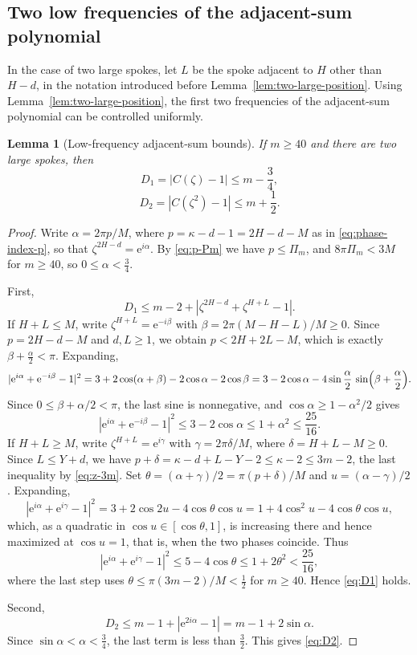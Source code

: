 \documentclass[11pt]{article}
\newtheorem{lemma}[theorem]{Lemma}
\theoremstyle{definition}
\theoremstyle{remark}
\numberwithin{equation}{section}
\newcommand{\e}{\mathrm{e}}
\begin{document}
\subsection{Two low frequencies of the adjacent-sum polynomial}

In the case of two large spokes, let $L$ be the spoke adjacent to $H$ other than $H-d$, in the notation introduced before Lemma~\ref{lem:two-large-position}. Using Lemma~\ref{lem:two-large-position}, the first two frequencies of the adjacent-sum polynomial can be controlled uniformly.

\begin{lemma}[Low-frequency adjacent-sum bounds]\label{lem:D12}
If $m\ge40$ and there are two large spokes, then
\begin{equation}\label{eq:D1}
  D_1=|C(\zeta)-1|\le m-\frac34,
\end{equation}
\begin{equation}\label{eq:D2}
  D_2=|C(\zeta^2)-1|\le m+\frac12.
\end{equation}
\end{lemma}

\begin{proof}
Write $\alpha=2\pi p/M$, where $p=\kappa-d-1=2H-d-M$ as in
\eqref{eq:phase-index-p}, so that $\zeta^{2H-d}=\e^{i\alpha}$. By
\eqref{eq:p-Pm} we have $p\le\Pi_m$, and $8\pi\Pi_m<3M$ for $m\ge40$, so
$0\le\alpha<\tfrac34$.

First,
\[
  D_1\le m-2+
  |\zeta^{2H-d}+\zeta^{H+L}-1|.
\]
If $H+L\le M$, write $\zeta^{H+L}=\e^{-i\beta}$ with
$\beta=2\pi(M-H-L)/M\ge0$. Since $p=2H-d-M$ and $d,L\ge1$, we obtain
$p<2H+2L-M$, which is exactly $\beta+\tfrac\alpha2<\pi$. Expanding,
\[
  |\e^{i\alpha}+\e^{-i\beta}-1|^2
  =3+2\cos(\alpha+\beta)-2\cos\alpha-2\cos\beta
  =3-2\cos\alpha-4\sin\frac\alpha2\,\sin\Bigl(\beta+\frac\alpha2\Bigr).
\]
Since $0\le\beta+\alpha/2<\pi$, the last sine is nonnegative, and
$\cos\alpha\ge1-\alpha^2/2$ gives
\[
  |\e^{i\alpha}+\e^{-i\beta}-1|^2
  \le3-2\cos\alpha\le1+\alpha^2\le\frac{25}{16}.
\]
If $H+L\ge M$, write $\zeta^{H+L}=\e^{i\gamma}$ with $\gamma=2\pi\delta/M$,
where $\delta=H+L-M\ge0$. Since $L\le Y+d$, we have
$p+\delta=\kappa-d+L-Y-2\le\kappa-2\le3m-2$, the last inequality by
\eqref{eq:z-3m}. Set $\theta=(\alpha+\gamma)/2=\pi(p+\delta)/M$ and
$u=(\alpha-\gamma)/2$. Expanding,
\[
  |\e^{i\alpha}+\e^{i\gamma}-1|^2
  =3+2\cos2u-4\cos\theta\cos u
  =1+4\cos^2u-4\cos\theta\cos u,
\]
which, as a quadratic in $\cos u\in[\cos\theta,1]$, is increasing there and
hence maximized at $\cos u=1$, that is, when the two phases coincide. Thus
\[
  |\e^{i\alpha}+\e^{i\gamma}-1|^2
  \le5-4\cos\theta
  \le1+2\theta^2
  <\frac{25}{16},
\]
where the last step uses $\theta\le\pi(3m-2)/M<\tfrac12$ for $m\ge40$. Hence
\eqref{eq:D1} holds.

Second,
\[
  D_2\le m-1+|\e^{2i\alpha}-1|
  =m-1+2\sin\alpha.
\]
Since $\sin\alpha<\alpha<\tfrac34$, the last term is less than $\tfrac32$.
This gives \eqref{eq:D2}.
\end{proof}
\end{document}
